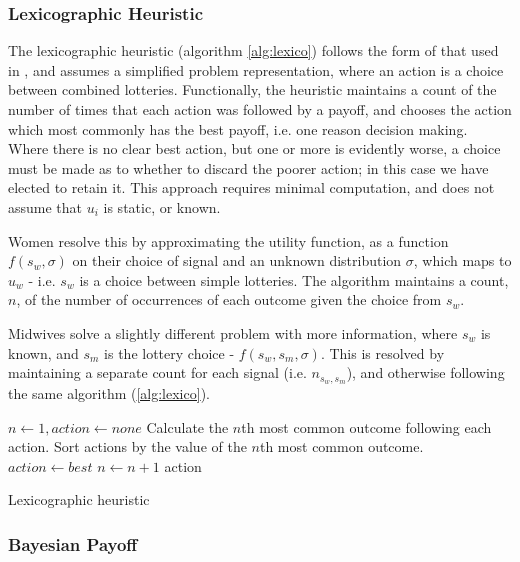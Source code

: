 \documentclass[graybox]{svmult}
\begin{document}
\subsubsection{Lexicographic Heuristic}
\label{sub:lexico}

The lexicographic heuristic (algorithm \ref{alg:lexico}) follows the form of that used in \cite{Hau2008}, and assumes a simplified problem representation, where an action is a choice between combined lotteries. Functionally, the heuristic maintains a count of the number of times that each action was followed by a payoff, and chooses the action which most commonly has the best payoff, i.e. one reason decision making. Where there is no clear best action, but one or more is evidently worse, a choice must be made as to whether to discard the poorer action; in this case we have elected to retain it.
This approach requires minimal computation, and does not assume that \(u_{i}\) is static, or known.

Women resolve this by approximating the utility function, as a function \(f(s_{w}, \sigma)\) on their choice of signal and an unknown distribution $\sigma$, which maps to \(u_{w}\) - i.e. \(s_{w}\) is a choice between simple lotteries. The algorithm maintains a count, \(n\), of the number of occurrences of each outcome given the choice from \(s_{w}\).

Midwives solve a slightly different problem with more information, where \(s_{w}\) is known, and \(s_{m}\) is the lottery choice - \(f(s_{w}, s_{m},\sigma)\). This is resolved by maintaining a separate count for each signal (i.e. \(n_{s_{w},s_{m}}\)), and otherwise following the same algorithm (\ref{alg:lexico}).

\begin{algorithm}
\begin{algorithmic}
\State $n \gets 1, action \gets none$
\State Calculate the $n$th most common outcome following each action.
\State Sort actions by the value of the $n$th most common outcome.
 \State $action \gets best$ \EndIf
\State $n \gets n + 1$
\EndWhile
\State \Return action
\end{algorithmic}
\caption{Lexicographic heuristic\label{alg:lexico}}
\end{algorithm}

\subsubsection{Bayesian Payoff}
\end{document}
